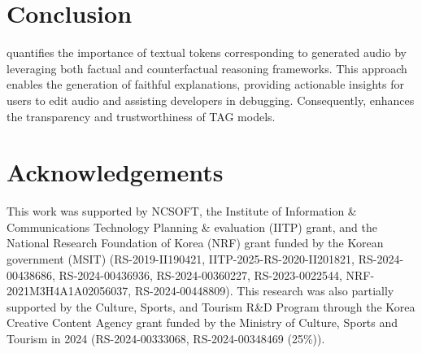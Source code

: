 \section{Conclusion}
\mname{} quantifies the importance of textual tokens corresponding to generated audio by leveraging both factual and counterfactual reasoning frameworks. This approach enables the generation of faithful explanations, providing actionable insights for users to edit audio and assisting developers in debugging. Consequently, \mname{} enhances the transparency and trustworthiness of TAG models.

\section{Acknowledgements}
This work was supported by NCSOFT, the Institute of Information \& Communications Technology Planning \& evaluation (IITP) grant, and the National Research Foundation of Korea (NRF) grant funded by the Korean government (MSIT) (RS-2019-II190421, IITP-2025-RS-2020-II201821, RS-2024-00438686, RS-2024-00436936, RS-2024-00360227, RS-2023-0022544, NRF-2021M3H4A1A02056037, RS-2024-00448809).  This research was also partially supported by the Culture, Sports, and Tourism R\&D Program through the Korea Creative Content Agency grant funded by the Ministry of Culture, Sports and Tourism in 2024 (RS-2024-00333068, RS-2024-00348469 (25\%)).
\newpage

